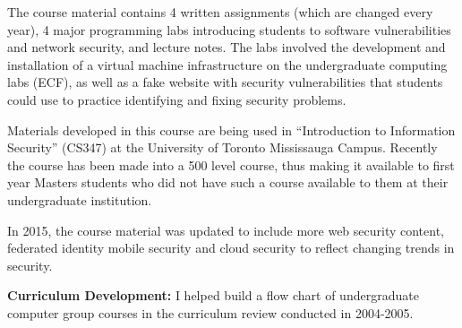 \documentclass[10pt]{article}
\newenvironment{lonelist}[1][\enskip\textbullet]%
        {\vspace{-\baselineskip}\begin{list}{#1}{%
        \setlength{\partopsep}{0pt}%
        \setlength{\topsep}{0pt}
	\setlength{\leftmargin}{0pt}}}
        {\end{list}\vspace{-.6\baselineskip}}
\newenvironment{innerlist}[1][\enskip\textbullet]%
        {\begin{compactitem}[#1]}{\end{compactitem}}
\begin{document}
\begin{lonelist}
\begin{innerlist}
The course material contains 4 written assignments (which are changed every year), 4 major programming labs introducing students to software vulnerabilities and network security, and lecture notes.  The labs involved the development and installation of a virtual machine infrastructure on the undergraduate computing labs (ECF), as well as a fake website with security vulnerabilities that students could use to practice identifying and fixing security problems.  

Materials developed in this course are being used in ``Introduction to
Information Security'' (CS347) at the University of Toronto
Mississauga Campus.  Recently the course has been made into a 500
level course, thus making it available to first year Masters students
who did not have such a course available to them at their
undergraduate institution.

In 2015, the course material was updated to include more web security content, federated identity mobile security and cloud security to reflect changing trends in security.

\item[] {\bf Curriculum Development:} I helped build a flow chart of undergraduate computer group courses in the curriculum review conducted in 2004-2005.
\end{innerlist}
\end{lonelist}
\end{document}
